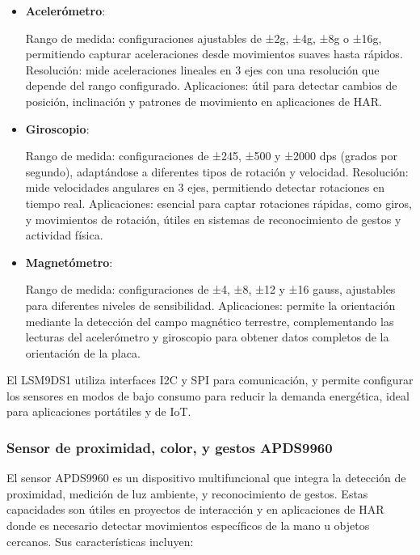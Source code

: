 \documentclass[12pt,a4paper]{article}
\begin{document}
\begin{itemize}
    \item \textbf{Acelerómetro}: 
 
        \subitem Rango de medida: configuraciones ajustables de ±2g, ±4g, ±8g o ±16g, permitiendo capturar aceleraciones desde movimientos suaves hasta rápidos.
        \subitem Resolución: mide aceleraciones lineales en 3 ejes con una resolución que depende del rango configurado.
        \subitem Aplicaciones: útil para detectar cambios de posición, inclinación y patrones de movimiento en aplicaciones de HAR.
    
    
    \item \textbf{Giroscopio}: 
  
        \subitem Rango de medida: configuraciones de ±245, ±500 y ±2000 dps (grados por segundo), adaptándose a diferentes tipos de rotación y velocidad.
        \subitem Resolución: mide velocidades angulares en 3 ejes, permitiendo detectar rotaciones en tiempo real.
        \subitem Aplicaciones: esencial para captar rotaciones rápidas, como giros, y movimientos de rotación, útiles en sistemas de reconocimiento de gestos y actividad física.
   
    
    \item \textbf{Magnetómetro}: 
    
        \subitem Rango de medida: configuraciones de ±4, ±8, ±12 y ±16 gauss, ajustables para diferentes niveles de sensibilidad.
        \subitem Aplicaciones: permite la orientación mediante la detección del campo magnético terrestre, complementando las lecturas del acelerómetro y giroscopio para obtener datos completos de la orientación de la placa.
   
\end{itemize}

El LSM9DS1 utiliza interfaces I2C y SPI para comunicación, y permite configurar los sensores en modos de bajo consumo para reducir la demanda energética, ideal para aplicaciones portátiles y de IoT.

\subsubsection{Sensor de proximidad, color, y gestos APDS9960}
El sensor APDS9960 \cite{sensor} es un dispositivo multifuncional que integra la detección de proximidad, medición de luz ambiente, y reconocimiento de gestos. Estas capacidades son útiles en proyectos de interacción y en aplicaciones de HAR donde es necesario detectar movimientos específicos de la mano u objetos cercanos. Sus características incluyen:
\end{document}
